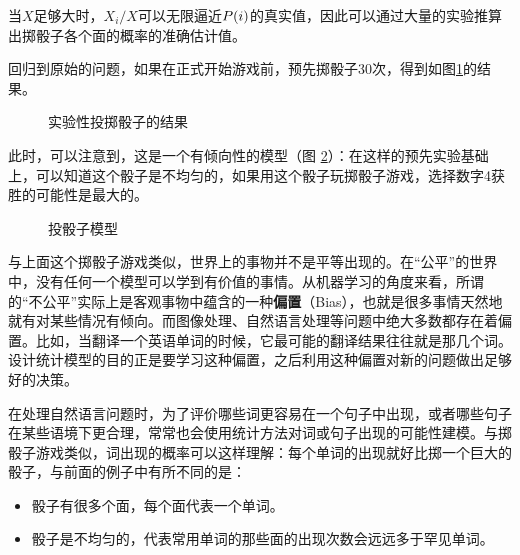\parinterval 当$X$足够大时，$X_i/X$可以无限逼近${P}(i)$的真实值，因此可以通过大量的实验推算出掷骰子各个面的概率的准确估计值。

\parinterval 回归到原始的问题，如果在正式开始游戏前，预先掷骰子30次，得到如图\ref{fig:2-5}的结果。

\begin{figure}[htp]
\centering

\caption{实验性投掷骰子的结果}
\label{fig:2-5}
\end{figure}

\parinterval 此时，可以注意到，这是一个有倾向性的模型（图 \ref{fig:2-6}）：在这样的预先实验基础上，可以知道这个骰子是不均匀的，如果用这个骰子玩掷骰子游戏，选择数字4获胜的可能性是最大的。

\begin{figure}[htp]
\centering

\caption{投骰子模型}
\label{fig:2-6}
\end{figure}

\parinterval 与上面这个掷骰子游戏类似，世界上的事物并不是平等出现的。在“公平”的世界中，没有任何一个模型可以学到有价值的事情。从机器学习的角度来看，所谓的“不公平”实际上是客观事物中蕴含的一种{\small\sffamily\bfseries{偏置}}（Bias），也就是很多事情天然地就有对某些情况有倾向。而图像处理、自然语言处理等问题中绝大多数都存在着偏置。比如，当翻译一个英语单词的时候，它最可能的翻译结果往往就是那几个词。设计统计模型的目的正是要学习这种偏置，之后利用这种偏置对新的问题做出足够好的决策。

\parinterval 在处理自然语言问题时，为了评价哪些词更容易在一个句子中出现，或者哪些句子在某些语境下更合理，常常也会使用统计方法对词或句子出现的可能性建模。与掷骰子游戏类似，词出现的概率可以这样理解：每个单词的出现就好比掷一个巨大的骰子，与前面的例子中有所不同的是：

\begin{itemize}
\vspace{0.5em}
\item 骰子有很多个面，每个面代表一个单词。
\vspace{0.5em}
\item 骰子是不均匀的，代表常用单词的那些面的出现次数会远远多于罕见单词。
\vspace{0.5em}
\end{itemize}

